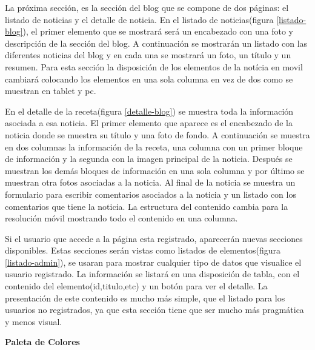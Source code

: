 \vspace{5 mm}

La próxima sección, es la sección del blog que se compone de dos páginas: el listado de noticias y el detalle de noticia. En el listado de noticias(figura \ref{listado-blog}), el primer elemento que se mostrará será un encabezado con una foto y descripción de la sección del blog. A continuación se mostrarán un listado con las diferentes noticias del blog y en cada una se mostrará un foto, un título y un resumen. Para esta sección la disposición de los elementos de la notícia en movil cambiará colocando los elementos en una sola columna en vez de dos como se muestran en tablet y pc.

\vspace{5 mm}

En el detalle de la receta(figura \ref{detalle-blog}) se muestra toda la información asociada a esa noticia. El primer elemento que aparece es el encabezado de la noticia donde se muestra su título y una foto de fondo. A continuación se muestra en dos columnas la información de la receta, una columna con un primer bloque de información y la segunda con la imagen principal de la noticia. Después se muestran los demás bloques de información en una sola columna y por último se muestran otra fotos asociadas a la noticia. Al final de la noticia se muestra un formulario para escribir comentarios asociados a la noticia y un listado con los comentarios que tiene la noticia. La estructura del contenido cambia para la resolución móvil mostrando todo el contenido en una columna.

\vspace{5 mm}

Si el usuario que accede a la página esta registrado, aparecerán nuevas secciones disponibles. Estas secciones serán vistas como listados de elementos(figura \ref{listado-admin}), se usaran para mostrar cualquier tipo de datos que visualice el usuario registrado. La información se listará en una disposición de tabla, con el contenido del elemento(id,titulo,etc) y un botón para ver el detalle. La presentación de este contenido es mucho más simple, que el listado para los usuarios no registrados, ya que esta sección tiene que ser mucho más pragmática y menos visual.

\vspace{5 mm}

\textbf{Paleta de Colores}

\vspace{5 mm}

